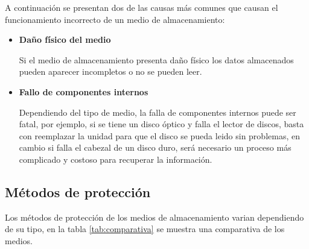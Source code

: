 A continuaci\'{o}n se presentan dos de las causas m\'{a}s comunes que causan el funcionamiento incorrecto de un medio de almacenamiento:

    \begin{itemize}

      \item \textbf{Da\~{n}o f\'{i}sico del medio}

Si el medio de almacenamiento presenta da\~{n}o f\'{i}sico los datos almacenados pueden aparecer incompletos o no se pueden leer.


      \item \textbf{Fallo de componentes internos}

Dependiendo del tipo de medio, la falla de componentes internos puede ser fatal, por ejemplo, si se tiene un disco \'{o}ptico y falla el lector de discos, basta con reemplazar la unidad para que el disco se pueda leido sin problemas, en cambio si falla el cabezal de un disco duro, ser\'{a} necesario un proceso m\'{a}s complicado y costoso para recuperar la informaci\'{o}n.


    \end{itemize}

  \subsection {M\'{e}todos de protecci\'{o}n}

Los m\'{e}todos de protecci\'{o}n de los medios de almacenamiento varian dependiendo de su tipo, en la tabla \ref{tab:comparativa} se muestra una comparativa de los medios.

